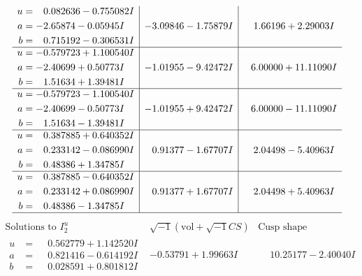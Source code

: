 \documentclass[1p]{elsarticle_modified}
\theoremstyle{definition}
\newcommand{\I}{\sqrt{-1}}
\begin{document}
$$\begin{array}{c|c|c}
\begin{aligned}
u &= \phantom{-}0.082636 - 0.755082 I \\
a &= -2.65874 - 0.05945 I \\
b &= \phantom{-}0.715192 - 0.306531 I\end{aligned}
 & -3.09846 - 1.75879 I & \phantom{-}1.66196 + 2.29003 I \\ \hline\begin{aligned}
u &= -0.579723 + 1.100540 I \\
a &= -2.40699 + 0.50773 I \\
b &= \phantom{-}1.51634 + 1.39481 I\end{aligned}
 & -1.01955 - 9.42472 I & \phantom{-}6.00000 + 11.11090 I \\ \hline\begin{aligned}
u &= -0.579723 - 1.100540 I \\
a &= -2.40699 - 0.50773 I \\
b &= \phantom{-}1.51634 - 1.39481 I\end{aligned}
 & -1.01955 + 9.42472 I & \phantom{-}6.00000 - 11.11090 I \\ \hline\begin{aligned}
u &= \phantom{-}0.387885 + 0.640352 I \\
a &= \phantom{-}0.233142 - 0.086990 I \\
b &= \phantom{-}0.48386 + 1.34785 I\end{aligned}
 & \phantom{-}0.91377 - 1.67707 I & \phantom{-}2.04498 - 5.40963 I \\ \hline\begin{aligned}
u &= \phantom{-}0.387885 - 0.640352 I \\
a &= \phantom{-}0.233142 + 0.086990 I \\
b &= \phantom{-}0.48386 - 1.34785 I\end{aligned}
 & \phantom{-}0.91377 + 1.67707 I & \phantom{-}2.04498 + 5.40963 I\\
 \hline 
 \end{array}$$\newpage$$\begin{array}{c|c|c}  
\text{Solutions to }I^u_{2}& \I (\text{vol} + \sqrt{-1}CS) & \text{Cusp shape}\\
 \hline 
\begin{aligned}
u &= \phantom{-}0.562779 + 1.142520 I \\
a &= \phantom{-}0.821416 - 0.614192 I \\
b &= \phantom{-}0.028591 + 0.801812 I\end{aligned}
 & -0.53791 + 1.99663 I & \phantom{-}10.25177 - 2.40040 I \\ \hline\begin{aligned}

\end{aligned}
\end{array}$$
\end{document}
